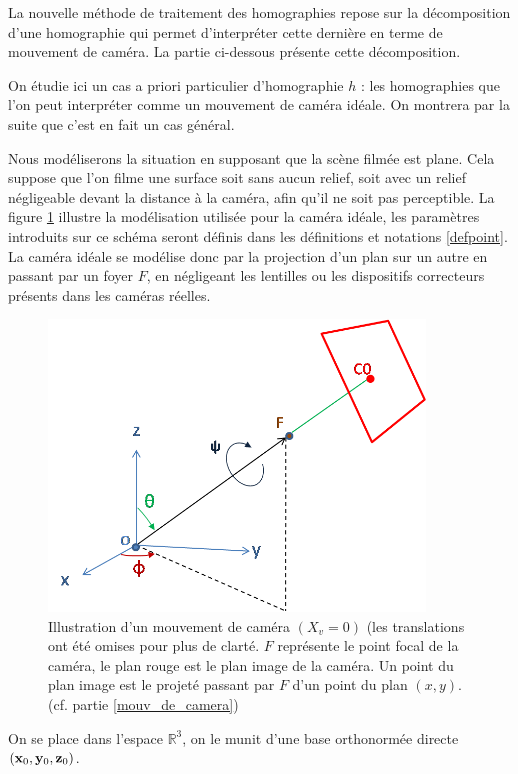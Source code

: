 La nouvelle méthode de traitement des homographies repose sur la décomposition d'une homographie qui permet d'interpréter cette dernière en terme de mouvement de caméra. La partie ci-dessous présente cette décomposition.

\label{mouv_de_camera}
On étudie ici un cas a priori particulier d'homographie $h$ : les homographies que l'on peut interpréter comme un mouvement de caméra idéale. On montrera par la suite que c'est en fait un cas général.

Nous modéliserons la situation en supposant que la scène filmée est plane. Cela suppose que l'on filme une surface soit sans aucun relief, soit avec un relief négligeable devant la distance à la caméra, afin qu'il ne soit pas perceptible. La figure \ref{shmdecomp} illustre la modélisation utilisée pour la caméra idéale, les paramètres introduits sur ce schéma seront définis dans les définitions et notations \ref{defpoint}. La caméra idéale se modélise donc par la projection d'un plan sur un autre en passant par un foyer $F$, en négligeant les lentilles ou les dispositifs correcteurs présents dans les caméras réelles.
\begin{figure}[h!]

\centering
\includegraphics[width=10cm]{shema_decomp.png}
\caption{Illustration d'un mouvement de caméra $(X_v =0)$ (les translations ont été omises pour plus de clarté. $F$ représente le point focal de la caméra, le plan rouge est le plan image de la caméra. Un point du plan image est le projeté passant par $F$ d'un point du plan $(x,y)$. (cf. partie \ref{mouv_de_camera})}
\label{shmdecomp}
\end{figure}


On se place dans l'espace $\mathbb{R}^{3}$, on le munit d'une base orthonormée directe $(\mathbf{x}_0,\mathbf{y}_0,\mathbf{z}_0)$.


